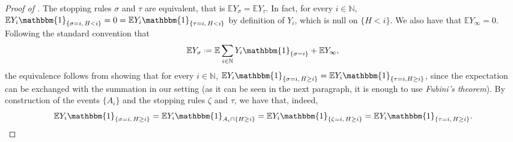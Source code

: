 \documentclass[11pt, a4paper, twoside]{article}
\newcommand*{\defeq}{\mathrel{\vcenter{\baselineskip0.5ex \lineskiplimit0pt
			\hbox{\scriptsize.}\hbox{\scriptsize.}}}=}
\newcommand{\NN}{\mathbb{N}}
\newcommand{\EE}{\mathbb{E}}
\newcommand{\II}{\mathbbm{1}}
\numberwithin{equation}{section}
\begin{document}
\begin{proof}[Proof of ]
		The stopping rules $\sigma$ and $\tau$ are equivalent, that is $\EE Y_\sigma=\EE Y_\tau$. In fact, for every $i\in\NN$, $\EE Y_i\II_{\{\sigma=i,\,H<i\}}=0=\EE Y_i\II_{\{\tau=i,\,H<i\}}$ by definition of $Y_i$, which is null on $\{H<i\}$. We also have that $\EE Y_\infty=0$. Following the standard convention that  \[\EE Y_{\sigma}\defeq \EE\sum_{i\in\NN}Y_i\II_{\{\sigma=i\}}+\EE Y_\infty,\] the equivalence follows from showing that for every $i\in\NN$, $\EE Y_i\II_{\{\sigma=i,\,H\ge i\}}=\EE Y_i\II_{\{\tau=i,H\ge i\}}$, since the expectation can be exchanged with the summation in our setting (as it can be seen in the next paragraph, it is enough to use \textit{Fubini's theorem}). By construction of the events $\{A_i\}$ and the stopping rules $\zeta$ and $\tau$, we have that, indeed, \[\EE Y_i\II_{\{\sigma=i,\,H\ge i\}}=\EE Y_i\II_{A_i\cap \{H\ge i\}}=\EE Y_i\II_{ \{\zeta=i,\,H\ge i\}}=\EE Y_i\II_{\{\tau=i,\,H\ge i\}}.\]
		

\end{proof}
\end{document}
